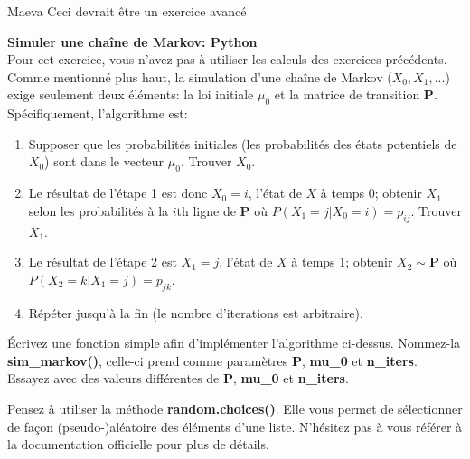 \begin{note}{Maeva}
    Ceci devrait être un exercice avancé
\end{note}
\begin{Exercice}[20 minutes]\textbf{Simuler une chaîne de Markov: Python}\\
Pour cet exercice, vous n'avez pas à utiliser les calculs des exercices précédents.\\

Comme mentionné plus haut, la simulation d'une chaîne de Markov ($X_0, X_1, ...$) exige seulement deux éléments: la loi initiale $\mu_0$ et la matrice de transition $\mathbf{P}$. Spécifiquement, l'algorithme est:

\begin{enumerate}
    \item Supposer que les probabilités initiales (les probabilités des états potentiels de $X_0$) sont dans le vecteur $\mu_0$. Trouver $X_0$.
    \item Le résultat de l'étape 1 est donc $X_0 = i$, l'état de $X$ à temps 0; obtenir $X_1$ selon les probabilités à la $i$th ligne de $\mathbf{P}$ où $P(X_1=j|X_0=i)=p_{ij}$. Trouver $X_1$.
    \item Le résultat de l'étape 2 est $X_1 = j$, l'état de $X$ à temps 1; obtenir $X_2 \sim \mathbf{P}$ où $P(X_2=k|X_1=j)=p_{jk}$.
    \item Répéter jusqu'à la fin (le nombre d'iterations est arbitraire).
\end{enumerate}

Écrivez une fonction simple afin d'implémenter l'algorithme ci-dessus. Nommez-la \textbf{sim\_markov()}, celle-ci prend comme paramètres \textbf{P}, \textbf{mu\_0} et \textbf{n\_iters}. Essayez avec des valeurs différentes de \textbf{P}, \textbf{mu\_0} et \textbf{n\_iters}.



\begin{conseil}
    Pensez à utiliser la méthode \textbf{random.choices()}. Elle vous permet de sélectionner de façon (pseudo-)aléatoire des éléments d'une liste. N'hésitez pas à vous référer à la documentation officielle pour plus de détails.
\end{conseil}
\begin{solution}

\end{solution}
\end{Exercice}

